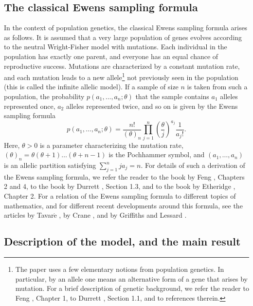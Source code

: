 \documentclass[12pt]{amsart}
\theoremstyle{definition}
\numberwithin{equation}{section}
\begin{document}
\subsection{The classical Ewens sampling formula}
 In the context of population genetics,
the classical Ewens sampling formula \cite{Ewens} arises as follows. It is assumed that
a very large population of genes evolves according to the neutral Wright-Fisher model with mutations. Each individual in the population has exactly one parent, and everyone
has an equal chance of reproductive success. Mutations are
characterized by a constant mutation rate, and each mutation leads to a new allele\footnote{The paper uses a few elementary notions from
population genetics. In particular, by an allele one means an alternative form of a gene that arises by mutation. For a brief description of genetic background, we refer the reader to Feng \cite{Feng}, Chapter 1, to Durrett \cite{Durrett}, Section 1.1, and to references therein.}
not previously seen in the population (this is called the infinite allelic model). If a sample of size $n$ is taken from such a population, the probability $p\left(a_1,\ldots,a_n;\theta\right)$ that
the sample contains $a_1$ alleles represented once, $a_2$ alleles represented twice, and so on is given by the Ewens sampling formula
\begin{equation}\label{ESF}
p\left(a_1,\ldots,a_n;\theta\right)=\frac{n!}{(\theta)_n}\prod\limits_{j=1}^n
\left(\frac{\theta}{j}\right)^{a_j}\frac{1}{a_j!}.
\end{equation}
Here, $\theta>0$  is a parameter
characterizing the mutation rate,
$(\theta)_n=\theta(\theta+1)\ldots(\theta+n-1)$ is the Pochhammer
symbol, and $(a_1,\ldots,a_n)$ is an allelic partition satisfying
$\sum_{j=1}^nja_j=n$.
For details of such a derivation of the Ewens sampling formula, we refer the reader to the book by Feng \cite{Feng}, Chapters 2 and 4,
 to the book by Durrett \cite{Durrett}, Section 1.3, and to the book by Etheridge \cite{Etheridge}, Chapter 2.
For a relation of the Ewens sampling formula to different topics
of mathematics, and for different recent developments around this formula, see the articles by Tavar$\acute{\mbox{e}}$ \cite {Tavare}, by Crane \cite{Crane}, and by Griffiths and Lessard \cite{GriffithsLessard}.








\subsection{Description of the model, and the main result}
\end{document}
